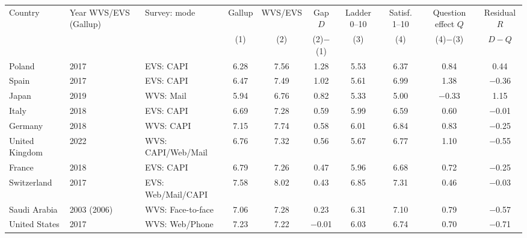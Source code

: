 \begin{tabular}{lllccccccc}
\toprule
Country & Year WVS/EVS (Gallup) & Survey: mode & Gallup & WVS/EVS & Gap $D$ & Ladder 0--10 & Satisf. 1--10 & Question effect $Q$ & Residual $R$ \\ & & & (1) & (2) & (2)$-$(1) & (3) & (4) & (4)$-$(3) & $D-Q$ \\
\midrule
Poland & 2017 & EVS: CAPI & 6.28 & 7.56 & 1.28 & 5.53 & 6.37 & 0.84 & 0.44 \\
Spain & 2017 & EVS: CAPI & 6.47 & 7.49 & 1.02 & 5.61 & 6.99 & 1.38 & \ensuremath{-}0.36 \\
Japan & 2019 & WVS: Mail & 5.94 & 6.76 & 0.82 & 5.33 & 5.00 & \ensuremath{-}0.33 & 1.15 \\
Italy & 2018 & EVS: CAPI & 6.69 & 7.28 & 0.59 & 5.99 & 6.59 & 0.60 & \ensuremath{-}0.01 \\
Germany & 2018 & WVS: CAPI & 7.15 & 7.74 & 0.58 & 6.01 & 6.84 & 0.83 & \ensuremath{-}0.25 \\
United Kingdom & 2022 & WVS: CAPI/Web/Mail & 6.76 & 7.32 & 0.56 & 5.67 & 6.77 & 1.10 & \ensuremath{-}0.55 \\
France & 2018 & EVS: CAPI & 6.79 & 7.26 & 0.47 & 5.96 & 6.68 & 0.72 & \ensuremath{-}0.25 \\
Switzerland & 2017 & EVS: Web/Mail/CAPI & 7.58 & 8.02 & 0.43 & 6.85 & 7.31 & 0.46 & \ensuremath{-}0.03 \\
Saudi Arabia & 2003 (2006) & WVS: Face-to-face & 7.06 & 7.28 & 0.23 & 6.31 & 7.10 & 0.79 & \ensuremath{-}0.57 \\
United States & 2017 & WVS: Web/Phone & 7.23 & 7.22 & \ensuremath{-}0.01 & 6.03 & 6.74 & 0.70 & \ensuremath{-}0.71 \\
\bottomrule
\end{tabular}

